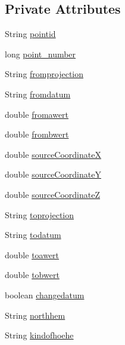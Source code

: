 \subsection*{Private Attributes}
\begin{DoxyCompactItemize}
\item 
String \hyperlink{classparams_1_1_control_parms_aa4531a579e0d7ae5f07853ac5f4141a2}{pointid}
\item 
long \hyperlink{classparams_1_1_control_parms_a3af78a8732b0695526059f88e10d7e9e}{point\+\_\+number}
\item 
String \hyperlink{classparams_1_1_control_parms_af020acb1b072ddea3560e25cac18ac3f}{fromprojection}
\item 
String \hyperlink{classparams_1_1_control_parms_aad346084aae4e796320eae7c950ce914}{fromdatum}
\item 
double \hyperlink{classparams_1_1_control_parms_ae0a950871fef34d367d8a70e80fc0fd0}{fromawert}
\item 
double \hyperlink{classparams_1_1_control_parms_ad4f4af5989abca7c5616feb442c2e7c0}{frombwert}
\item 
double \hyperlink{classparams_1_1_control_parms_a2688293d730d637a973567b209289996}{source\+CoordinateX}
\item 
double \hyperlink{classparams_1_1_control_parms_a3e2c396bf201d9c84f4efdf8dfef51d1}{source\+CoordinateY}
\item 
double \hyperlink{classparams_1_1_control_parms_ae3c3b4ee3fb2bef870380e13e573aec2}{source\+CoordinateZ}
\item 
String \hyperlink{classparams_1_1_control_parms_ad4c562a7ccfd2c0909af99b2555f7c12}{toprojection}
\item 
String \hyperlink{classparams_1_1_control_parms_a930769d55920443b555a18d86f79a410}{todatum}
\item 
double \hyperlink{classparams_1_1_control_parms_a15c11042320f3bdcc8da8d2cc885b975}{toawert}
\item 
double \hyperlink{classparams_1_1_control_parms_a1d7775bde246e74d651d87ca38e247ba}{tobwert}
\item 
boolean \hyperlink{classparams_1_1_control_parms_a863cdfdf5647ef0c8f9864cae1dfc753}{changedatum}
\item 
String \hyperlink{classparams_1_1_control_parms_a1b7d4bdc68c2531026174a04ad715cbf}{northhem}
\item 
String \hyperlink{classparams_1_1_control_parms_a639927766fce23759b47659a9abf0e6f}{kindofhoehe}
\item 

\end{DoxyCompactItemize}
